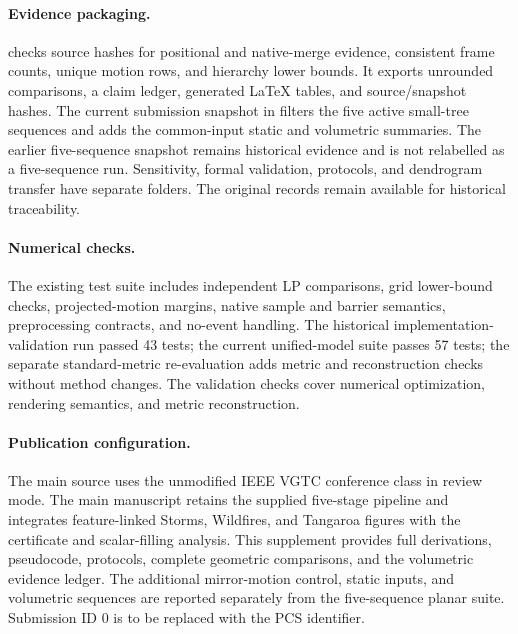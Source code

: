 \documentclass[10pt,letterpaper]{article}
\theoremstyle{remark}\newtheorem{remark}[lemma]{Remark}
\begin{document}
\paragraph{Evidence packaging.}  checks source hashes for positional and native-merge evidence, consistent frame counts, unique motion rows, and hierarchy lower bounds. It exports unrounded comparisons, a claim ledger, generated LaTeX tables, and source/snapshot hashes. The current submission snapshot in  filters the five active small-tree sequences and adds the common-input static and volumetric summaries. The earlier five-sequence snapshot remains historical evidence and is not relabelled as a five-sequence run. Sensitivity, formal validation, protocols, and dendrogram transfer have separate folders. The original records remain available for historical traceability.

\paragraph{Numerical checks.} The existing test suite includes independent LP comparisons, grid lower-bound checks, projected-motion margins, native sample and barrier semantics, preprocessing contracts, and no-event handling. The historical implementation-validation run passed 43 tests; the current unified-model suite passes 57 tests; the separate standard-metric re-evaluation adds metric and reconstruction checks without method changes. The validation checks cover numerical optimization, rendering semantics, and metric reconstruction.

\paragraph{Publication configuration.} The main source uses the unmodified IEEE VGTC conference class in review mode. The main manuscript retains the supplied five-stage pipeline and integrates feature-linked Storms, Wildfires, and Tangaroa figures with the certificate and scalar-filling analysis. This supplement provides full derivations, pseudocode, protocols, complete geometric comparisons, and the volumetric evidence ledger. The additional mirror-motion control, static inputs, and volumetric sequences are reported separately from the five-sequence planar suite. Submission ID 0 is to be replaced with the PCS identifier.
\clearpage

\clearpage

\clearpage




\end{document}
